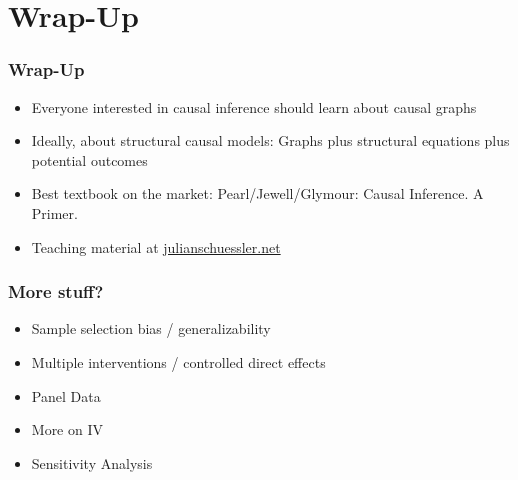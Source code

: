 \documentclass{beamer}
\begin{document}
\section*{Wrap-Up}
\begin{frame}[t]
\sectionpage
\end{frame}


\begin{frame}[t]
\frametitle{Wrap-Up}
\begin{itemize}
	\item<1-> Everyone interested in causal inference should learn about causal graphs
	\item<1-> Ideally, about structural causal models: Graphs plus structural equations plus potential outcomes
	\item<1-> Best textbook on the market: Pearl/Jewell/Glymour: Causal Inference. A Primer.
	\item<1-> Teaching material at \href{julianschuessler.net}{julianschuessler.net}
\end{itemize}
\end{frame}

\begin{frame}[t]
\frametitle{More stuff?}
\begin{itemize}
	\item<1-> Sample selection bias / generalizability
	\item<1-> Multiple interventions / controlled direct effects
	\item<1-> Panel Data
	\item<1-> More on IV 
	\item<1-> Sensitivity Analysis
\end{itemize}
\end{frame}
\end{document}
